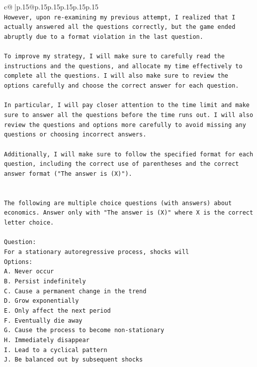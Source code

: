 \documentclass{article}
\begin{document}
{\begin{supertabular}{c@{$\;$}|p{.15\linewidth}@{}p{.15\linewidth}p{.15\linewidth}p{.15\linewidth}p{.15\linewidth}p{.15\linewidth}}
{{{\\ 
\texttt{However, upon re{-}examining my previous attempt, I realized that I actually answered all the questions correctly, but the game ended abruptly due to a format violation in the last question. } \\
\\ 
\texttt{To improve my strategy, I will make sure to carefully read the instructions and the questions, and allocate my time effectively to complete all the questions. I will also make sure to review the options carefully and choose the correct answer for each question. } \\
\\ 
\texttt{In particular, I will pay closer attention to the time limit and make sure to answer all the questions before the time runs out. I will also review the questions and options more carefully to avoid missing any questions or choosing incorrect answers. } \\
\\ 
\texttt{Additionally, I will make sure to follow the specified format for each question, including the correct use of parentheses and the correct answer format ("The answer is (X)").} \\
\\ 
\\ 
\texttt{The following are multiple choice questions (with answers) about economics. Answer only with "The answer is (X)" where X is the correct letter choice.} \\
\\ 
\texttt{Question:} \\
\texttt{For a stationary autoregressive process, shocks will} \\
\texttt{Options:} \\
\texttt{A. Never occur} \\
\texttt{B. Persist indefinitely} \\
\texttt{C. Cause a permanent change in the trend} \\
\texttt{D. Grow exponentially} \\
\texttt{E. Only affect the next period} \\
\texttt{F. Eventually die away} \\
\texttt{G. Cause the process to become non{-}stationary} \\
\texttt{H. Immediately disappear} \\
\texttt{I. Lead to a cyclical pattern} \\
\texttt{J. Be balanced out by subsequent shocks} \\
}}}
\end{supertabular}}
\end{document}
